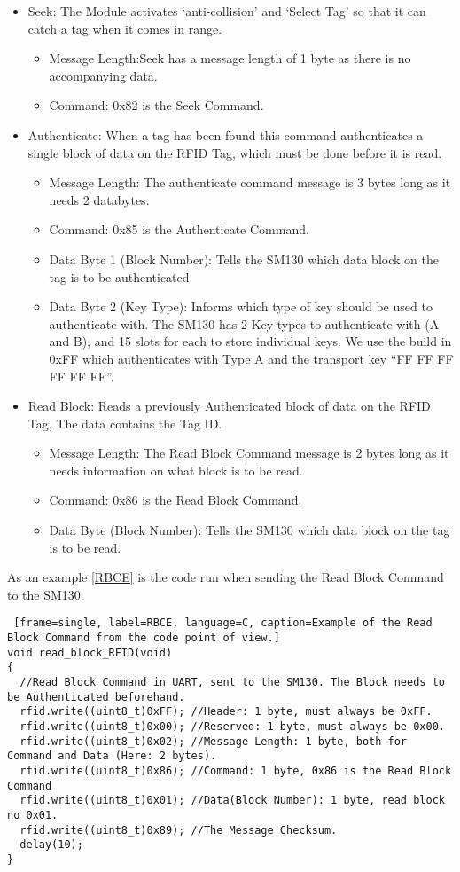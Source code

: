 \begin{itemize}
	\item Seek: The Module activates `anti-collision' and `Select Tag' so that it can catch a tag when it comes in range.
	\begin{itemize}
		\item Message Length:Seek has a message length of 1 byte as there is no accompanying data.
		\item Command: 0x82 is the Seek Command.
	\end{itemize}
	\item Authenticate: When a tag has been found this command authenticates a single block of data on the RFID Tag, which must be done before it is read.
	\begin{itemize}
		\item Message Length: The authenticate command message is 3 bytes long as it needs 2 databytes.
		\item Command: 0x85 is the Authenticate Command.
		\item Data Byte 1 (Block Number): Tells the SM130 which data block on the tag is to be authenticated.
		\item Data Byte 2 (Key Type): Informs which type of key should be used to authenticate with. The SM130 has 2 Key types to authenticate with (A and B), and 15 slots for each to store individual keys. We use the build in 0xFF which authenticates with Type A and the transport key ``FF FF FF FF FF FF''.
	\end{itemize}
	\item Read Block: Reads a previously Authenticated block of data on the RFID Tag, The data contains the Tag ID.
	\begin{itemize}
		\item Message Length: The Read Block Command message is 2 bytes long as it needs information on what block is to be read.
		\item Command: 0x86 is the Read Block Command.
		\item Data Byte (Block Number): Tells the SM130 which data block on the tag is to be read.
	\end{itemize}
\end{itemize}

As an example \autoref{RBCE} is the code run when sending the Read Block Command to the SM130.
\begin{lstlisting} [frame=single, label=RBCE, language=C, caption=Example of the Read Block Command from the code point of view.]
void read_block_RFID(void)
{
  //Read Block Command in UART, sent to the SM130. The Block needs to be Authenticated beforehand.
  rfid.write((uint8_t)0xFF); //Header: 1 byte, must always be 0xFF.
  rfid.write((uint8_t)0x00); //Reserved: 1 byte, must always be 0x00.  
  rfid.write((uint8_t)0x02); //Message Length: 1 byte, both for Command and Data (Here: 2 bytes).
  rfid.write((uint8_t)0x86); //Command: 1 byte, 0x86 is the Read Block Command
  rfid.write((uint8_t)0x01); //Data(Block Number): 1 byte, read block no 0x01. 
  rfid.write((uint8_t)0x89); //The Message Checksum.
  delay(10); 
}													
\end{lstlisting}


